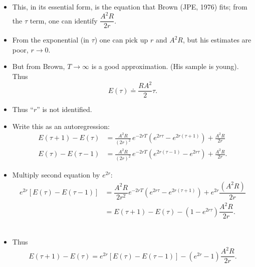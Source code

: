 \documentclass[12pt,compress,handout]{beamer}  %
\begin{document}
\begin{frame}

\begin{itemize}
\item
This, in its essential form, is the equation that Brown (JPE, 1976) fits; from
the $\tau $ term, one can identify $\dfrac{A^{2} R}{2r}$.\\[3mm]

\item
From the exponential (in $\tau $) one can pick up $r$ and $A^{2}R$, but his
estimates are poor, $r \rightarrow 0$.\\[3mm]

\item
But from Brown, $T \rightarrow \infty$ is a good approximation. (His sample is
young). Thus
\begin{equation*}
    E(\tau )\doteq \dfrac{RA^2}{2}\tau.
\end{equation*}

\item
Thus ``$r$'' is not identified.
\end{itemize}

\end{frame}


\begin{frame}
\begin{itemize}
\item Write this as an autoregression:
\begin{align*}
E(\tau +1) -E(\tau )& =\frac{A^2R}{(2r)^2}\,e^{-2rT}\left( e^{2r\tau }-e^{2r(\tau +1)}\right) +\frac{A^2R}{2r}\\[3mm]
E(\tau )-E(\tau -1)& =\frac{A^2R}{(2r)^2}\,e^{-2rT}\left( e^{2r(\tau
-1)}-e^{2r\tau }\right) +\frac{A^2R}{2r}\text{.}
\end{align*}
\end{itemize}
\end{frame}

\begin{frame}
\begin{itemize}
\item Multiply second equation by $e^{2r}$:
\begin{align*}
e^{2r}[E(\tau )-E(\tau -1)]& =\dfrac{A^{2}R}{2r^{2}}e^{-2rT}(e^{2r\tau }-e^{2r(\tau +1)})+e^{2r}\dfrac{(A^{2}R)}{2r}\\[3mm]
& =E(\tau +1)-E(\tau )-(1-e^{2r\tau })\dfrac{A^{2}R}{2r}\text{.}
\end{align*}\ \\[3mm]
\item Thus
\begin{equation*}
E(\tau +1)-E(\tau )=e^{2r}[E(\tau )-E(\tau
-1)]-(e^{2r}-1)\dfrac{A^{2}R}{2r}\text{.}
\end{equation*}
\end{itemize}
\end{frame}
\end{document}

